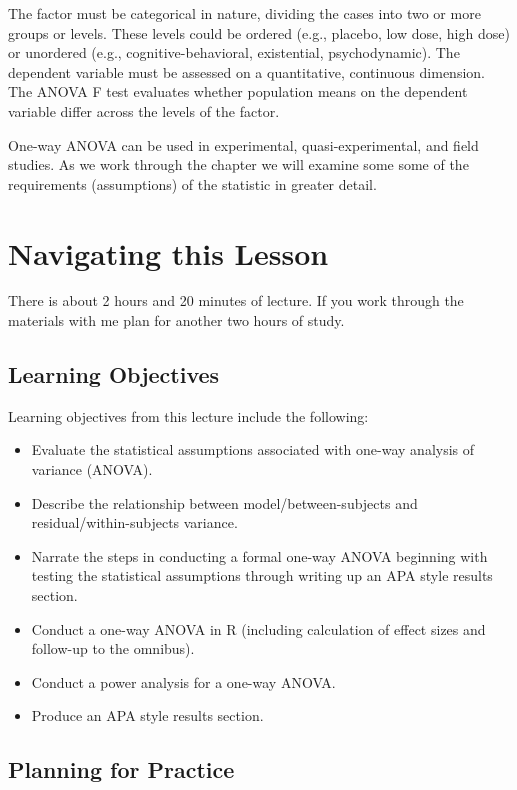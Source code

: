 \documentclass[
  english,
]{book}
\providecommand{\tightlist}{%
  \setlength{\itemsep}{0pt}\setlength{\parskip}{0pt}}
\begin{document}
The factor must be categorical in nature, dividing the cases into two or more groups or levels. These levels could be ordered (e.g., placebo, low dose, high dose) or unordered (e.g., cognitive-behavioral, existential, psychodynamic). The dependent variable must be assessed on a quantitative, continuous dimension. The ANOVA F test evaluates whether population means on the dependent variable differ across the levels of the factor.

One-way ANOVA can be used in experimental, quasi-experimental, and field studies. As we work through the chapter we will examine some some of the requirements (assumptions) of the statistic in greater detail.

\hypertarget{navigating-this-lesson-2}{%
\section{Navigating this Lesson}\label{navigating-this-lesson-2}}

There is about 2 hours and 20 minutes of lecture. If you work through the materials with me plan for another two hours of study.

\hypertarget{learning-objectives-2}{%
\subsection{Learning Objectives}\label{learning-objectives-2}}

Learning objectives from this lecture include the following:

\begin{itemize}
\tightlist
\item
  Evaluate the statistical assumptions associated with one-way analysis of variance (ANOVA).
\item
  Describe the relationship between model/between-subjects and residual/within-subjects variance.
\item
  Narrate the steps in conducting a formal one-way ANOVA beginning with testing the statistical assumptions through writing up an APA style results section.
\item
  Conduct a one-way ANOVA in R (including calculation of effect sizes and follow-up to the omnibus).
\item
  Conduct a power analysis for a one-way ANOVA.
\item
  Produce an APA style results section.
\end{itemize}

\hypertarget{planning-for-practice-1}{%
\subsection{Planning for Practice}\label{planning-for-practice-1}}
\end{document}
